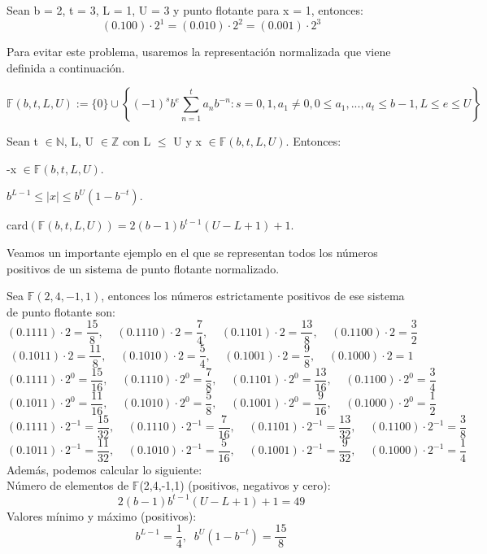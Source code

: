 \begin{ejemplo}
Sean b = 2, t = 3, L = 1, U = 3 y punto flotante para x = 1, entonces:
\[ (0.100) \cdot 2^1 = (0.010) \cdot 2^2 = (0.001) \cdot 2^3 \]
\end{ejemplo}

Para evitar este problema, usaremos la representación normalizada que viene definida a continuación.

\begin{ndef}
\[ \mathbb{F} (b,t,L,U) := \lbrace 0 \rbrace \cup \left\lbrace (-1)^sb^e \sum_{n=1}^t a_nb^{-n} : s = 0,1, a_1 \neq 0, 0 \leq a_1,...,a_t \leq b - 1, L \leq e \leq U \right\rbrace \]
\end{ndef}

\begin{nprop}
Sean t $\in \mathbb{N}$, L, U $\in \mathbb{Z}$ con L $\leq$ U y x $\in \mathbb{F} (b,t,L,U)$. Entonces:
	\begin{nlist}
	\item -x $\in \mathbb{F} (b,t,L,U)$.
	\item $b^{L-1} \leq \vert x \vert \leq b^U(1 - b^{-t})$.
	\item card$( \mathbb{F} (b,t,L,U)) = 2(b-1)b^{t-1}(U-L+1)+1$.
	\end{nlist}
\end{nprop}

Veamos un importante ejemplo en el que se representan todos los números positivos de un sistema de punto flotante normalizado.

\begin{ejemplo}
Sea $\mathbb{F} (2,4,-1,1)$, entonces los números estrictamente positivos de ese sistema de punto flotante son:
\[ (0.1111) \cdot 2 = \frac{15}{8}, \; \; \; \; (0.1110) \cdot 2 = \frac{7}{4}, \; \; \; \; (0.1101) \cdot 2 = \frac{13}{8}, \; \; \; \; (0.1100) \cdot 2 = \frac{3}{2} \]
\[ (0.1011) \cdot 2 = \frac{11}{8}, \; \; \; \; (0.1010) \cdot 2 = \frac{5}{4}, \; \; \; \; (0.1001) \cdot 2 = \frac{9}{8}, \; \; \; \; (0.1000) \cdot 2 = 1 \]
\[ (0.1111) \cdot 2^0 = \frac{15}{16}, \; \; \; \; (0.1110) \cdot 2^0 = \frac{7}{8}, \; \; \; \; (0.1101) \cdot 2^0 = \frac{13}{16}, \; \; \; \; (0.1100) \cdot 2^0 = \frac{3}{4} \]
\[ (0.1011) \cdot 2^0 = \frac{11}{16}, \; \; \; \; (0.1010) \cdot 2^0 = \frac{5}{8}, \; \; \; \; (0.1001) \cdot 2^0 = \frac{9}{16}, \; \; \; \; (0.1000) \cdot 2^0 = \frac{1}{2} \]
\[ (0.1111) \cdot 2^{-1} = \frac{15}{32}, \; \; \; \; (0.1110) \cdot 2^{-1} = \frac{7}{16}, \; \; \; \; (0.1101) \cdot 2^{-1} = \frac{13}{32}, \; \; \; \; (0.1100) \cdot 2^{-1} = \frac{3}{8} \]
\[ (0.1011) \cdot 2^{-1} = \frac{11}{32}, \; \; \; \; (0.1010) \cdot 2^{-1} = \frac{5}{16}, \; \; \; \; (0.1001) \cdot 2^{-1} = \frac{9}{32}, \; \; \; \; (0.1000) \cdot 2^{-1} = \frac{1}{4} \]
Además, podemos calcular lo siguiente:\\
Número de elementos de $\mathbb{F}$(2,4,-1,1) (positivos, negativos y cero):
\[ 2(b-1)b^{t-1}(U-L+1) + 1 = 49 \]
Valores mínimo y máximo (positivos):
\[ b^{L-1} = \frac{1}{4}, \; \; b^U(1-b^{-t}) = \frac{15}{8} \]
\end{ejemplo}

